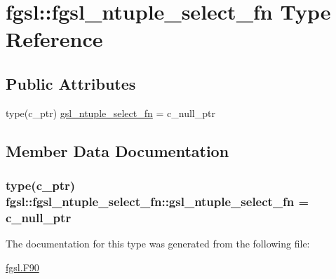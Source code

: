 \hypertarget{structfgsl_1_1fgsl__ntuple__select__fn}{\section{fgsl\-:\-:fgsl\-\_\-ntuple\-\_\-select\-\_\-fn Type Reference}
\label{structfgsl_1_1fgsl__ntuple__select__fn}
}
\subsection*{Public Attributes}
\begin{DoxyCompactItemize}
\item 
type(c\-\_\-ptr) \hyperlink{structfgsl_1_1fgsl__ntuple__select__fn_addb721eac032c0a2e4b45dfd7cbb036e}{gsl\-\_\-ntuple\-\_\-select\-\_\-fn} = c\-\_\-null\-\_\-ptr
\end{DoxyCompactItemize}


\subsection{Member Data Documentation}
\hypertarget{structfgsl_1_1fgsl__ntuple__select__fn_addb721eac032c0a2e4b45dfd7cbb036e}{
\subsubsection[{gsl\-\_\-ntuple\-\_\-select\-\_\-fn}]{\setlength{\rightskip}{0pt plus 5cm}type(c\-\_\-ptr) fgsl\-::fgsl\-\_\-ntuple\-\_\-select\-\_\-fn\-::gsl\-\_\-ntuple\-\_\-select\-\_\-fn = c\-\_\-null\-\_\-ptr}}\label{structfgsl_1_1fgsl__ntuple__select__fn_addb721eac032c0a2e4b45dfd7cbb036e}


The documentation for this type was generated from the following file\-:\begin{DoxyCompactItemize}
\item 
\hyperlink{fgsl_8F90}{fgsl.\-F90}\end{DoxyCompactItemize}
